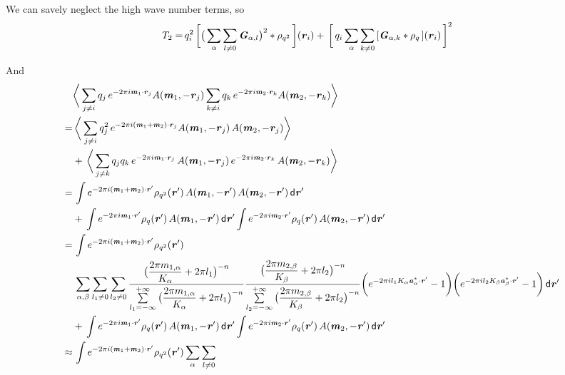 \documentclass[aps,pre,preprint]{revtex4}
\renewcommand{\v}[1]{\textbf{\textit{#1}}}
\renewcommand{\d}[1]{\textsf{#1}}
\begin{document}
We can savely neglect the high wave number terms, so
\begin{align}
  T_2
  = &\,
  q_i^2\,
  \bigg[
  \big(
  \sum_{\alpha} \sum_{l\neq 0}  
  \v G_{\alpha,l}
  \big)^2
  \ast \rho_{q^2}\,
  \bigg] (\v r_i) + \,
  \bigg[\,
  q_i \sum_{\alpha}\sum_{k\neq 0}
  \,[\v G_{\alpha,k}\ast\rho_q\,] (\v r_i)
  \,\bigg]^2 
\end{align}

And 
\begin{align} \nonumber
  & \bigg\langle
  \sum_{j\neq i}q_j\,e^{-2\pi i\v m_1\cdot\v r_j}A(\v m_1, -\v r_j)
  \sum_{k\neq i}q_k\,e^{-2\pi i\v m_2\cdot\v r_k}A(\v m_2, -\v r_k)
  \bigg\rangle \\ \nonumber
  = &\,
  \bigg\langle
  \sum_{j\neq i}q^2_j\,e^{-2\pi i(\v m_1+\v m_2)\cdot\v r_j}A(\v m_1, -\v r_j)\,A(\v m_2, -\v r_j)
  \bigg\rangle \\ \nonumber
  &+ \,
  \bigg\langle
  \sum_{j\neq k}q_jq_k\,
  e^{-2\pi i\v m_1\cdot\v r_j}\,A(\v m_1, -\v r_j)\,
  e^{-2\pi i\v m_2\cdot\v r_k}\,A(\v m_2, -\v r_k)
  \bigg\rangle \\ \nonumber
  = &\,
  \int
  e^{-2\pi i (\v m_1 + \v m_2)\cdot\v r'}\rho_{q^2}(\v r')\,A(\v m_1,-\v r')\,A(\v m_2,-\v r')\,\d d\v r' \\\nonumber
  &+ \,
  \int
  e^{-2\pi i\v m_1\cdot\v r'}\rho_q(\v r')\,A(\v m_1,-\v r')\,\d d\v r'
  \int
  e^{-2\pi i\v m_2\cdot\v r'}\rho_q(\v r')\,A(\v m_2,-\v r') \,\d d\v r' \\\nonumber
  = &\,
  \int
  e^{-2\pi i (\v m_1 + \v m_2)\cdot\v r'}\rho_{q^2}(\v r') \\\nonumber
  &\,
  \sum_{\alpha, \beta}\sum_{l_1\neq 0}\sum_{l_2\neq 0}
  \frac
  {\big(\dfrac{2\pi m_{1,\alpha}}{K_\alpha} + 2\pi l_1\big)^{-n}}
  {\sum\limits_{l_1=-\infty}^{+\infty}
    \big(\dfrac{2\pi m_{1,\alpha}}{K_\alpha} + 2\pi l_1\big)^{-n}}
  \frac
  {\big(\dfrac{2\pi m_{2,\beta}}{K_\beta} + 2\pi l_2\big)^{-n}}
  {\sum\limits_{l_2=-\infty}^{+\infty}
    \big(\dfrac{2\pi m_{2,\beta}}{K_\beta} + 2\pi l_2\big)^{-n}}
  \bigg(
  e^{-2\pi i l_1 K_\alpha\v a^\ast_\alpha\cdot \v r'} - 1
  \bigg)
  \bigg(
  e^{-2\pi i l_2 K_\beta\v a^\ast_\beta\cdot \v r'} - 1
  \bigg)
  \,\d d\v r' \\\nonumber
  &+ \,
  \int
  e^{-2\pi i\v m_1\cdot\v r'}\rho_q(\v r')\,A(\v m_1,-\v r')\,\d d\v r'
  \int
  e^{-2\pi i\v m_2\cdot\v r'}\rho_q(\v r')\,A(\v m_2,-\v r') \,\d d\v r' \\\nonumber
  \approx &\,
  \int
  e^{-2\pi i (\v m_1 + \v m_2)\cdot\v r'}\rho_{q^2}(\v r') 
  \sum_{\alpha}\sum_{l\neq 0}

\end{align}
\end{document}
